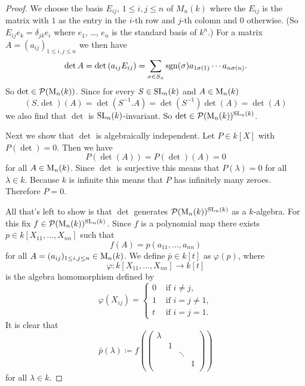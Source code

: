 \begin{proof}
  We choose the basis $E_{ij}$, $1 \leq i,j \leq n$ of $M_n(k)$ where the $E_{ij}$ is the matrix with $1$ as the entry in the $i$-th row and $j$-th colomn and $0$ otherwise.
  (So $E_{ij} e_k = \delta_{jk}e_i$ where $e_1$, \dots, $e_n$ is the standard basis of $k^n$.)
  For a matrix $A = (a_{ij})_{1 \leq i,j \leq n}$ we then have
  \[
      \det A
    = \det\left( a_{ij} E_{ij} \right)
    = \sum_{\sigma \in S_n} \operatorname{sgn}(\sigma) a_{1 \sigma(1)} \dotsm a_{n \sigma(n)}.
  \]
  So $\det \in \mathcal{P}(\operatorname{M}_n(k))$.
  Since for every $S \in \operatorname{SL}_n(k)$ and $A \in \operatorname{M}_n(k)$
  \[
      (S.\det)(A)
    = \det\left(S^{-1}.A\right)
    = \det\left( S^{-1} \right) \det(A)
    = \det(A)
  \]
  we also find that $\det$ is $\operatorname{SL}_n(k)$-invariant.
  So $\det \in \mathcal{P}(\operatorname{M}_n(k))^{\operatorname{SL}_n(k)}$.
  
  Next we show that $\det$ is algebraically independent.
  Let $P \in k[X]$ with $P(\det) = 0$. Then we have
  \[
      P(\det(A))
    = P(\det)(A)
    = 0
  \]
  for all $A \in \operatorname{M}_n(k)$.
  Since $\det$ is surjective this means that $P(\lambda) = 0$ for all $\lambda \in k$.
  Because $k$ is infinite this means that $P$ has infinitely many zeroes.
  Therefore $P = 0$.
  
  All that’s left to show is that $\det$ generates $\mathcal{P}(\operatorname{M}_n(k))^{\operatorname{SL}_n(k)}$ as a $k$-algebra.
  For this fix $f \in \mathcal{P}(\operatorname{M}_n(k))^{\operatorname{SL}_n(k)}$.
  Since $f$ is a polynomial map there exists $p \in k[X_{11}, \dotsc, X_{nn}]$ such that
  \[
      f(A)
    = p(a_{11}, \dotsc, a_{nn})
  \]
  for all $A = (a_{ij})_{1 \leq i,j \leq n} \in \operatorname{M}_n(k)$.
  We define $\bar{p} \in k[t]$ as $\varphi(p)$, where
  \[
            \varphi
    \colon  k[X_{11}, \dotsc, X_{nn}]
    \to     k[t]
  \] 
  is the algebra homomorphism defined by 
  \[
      \varphi(X_{ij})
    = \begin{cases}
        0 & \text{ if } i \neq j,     \\
        1 & \text{ if } i = j \neq 1, \\
        t & \text{ if } i = j = 1.
      \end{cases}
  \]
  It is clear that
  \[
              \bar{p}(\lambda)
    \coloneqq f\left(
                \begin{pmatrix}
                  \lambda &   &        &   \\
                          & 1 &        &   \\
                          &   & \ddots &   \\
                          &   &        & 1 \\
                \end{pmatrix}
              \right)
  \]
  for all $\lambda \in k$.
  

\end{proof}
